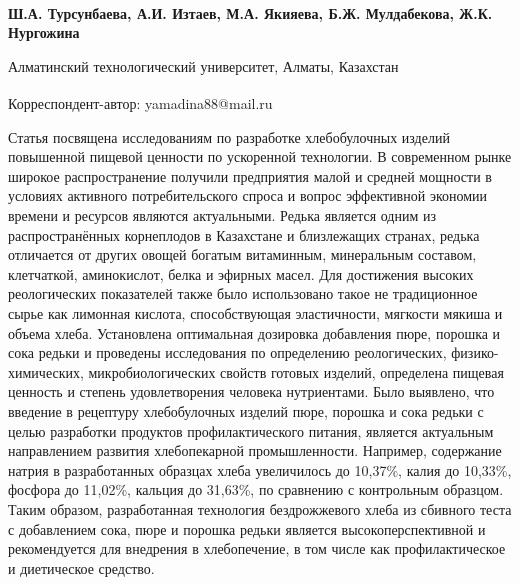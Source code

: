 
\begin{articleheader}

{\bfseries
Ш.А. Турсунбаева,
А.И. Изтаев,
М.А. Якияева\textsuperscript{\envelope },
Б.Ж. Мулдабекова,
Ж.К. Нургожина
}
\end{articleheader}

\begin{affiliation}
Алматинский технологический университет, Алматы, Казахстан

\raggedright \textsuperscript{\envelope }Корреспондент-автор: yamadina88@mail.ru
\end{affiliation}

Статья посвящена исследованиям по разработке хлебобулочных изделий
повышенной пищевой ценности по ускоренной технологии. В современном
рынке широкое распространение получили предприятия малой и средней
мощности в условиях активного потребительского спроса и вопрос
эффективной экономии времени и ресурсов являются актуальными. Редька
является одним из распространённых корнеплодов в Казахстане и
близлежащих странах, редька отличается от других овощей богатым
витаминным, минеральным составом, клетчаткой, аминокислот, белка и
эфирных масел. Для достижения высоких реологических показателей также
было использовано такое не традиционное сырье как лимонная кислота,
способствующая эластичности, мягкости мякиша и объема хлеба. Установлена
оптимальная дозировка добавления пюре, порошка и сока редьки и проведены
исследования по определению реологических, физико-химических,
микробиологических свойств готовых изделий, определена пищевая ценность
и степень удовлетворения человека нутриентами. Было выявлено, что
введение в рецептуру хлебобулочных изделий пюре, порошка и сока редьки с
целью разработки продуктов профилактического питания, является
актуальным направлением развития хлебопекарной промышленности. Например,
содержание натрия в разработанных образцах хлеба увеличилось до 10,37\%,
калия до 10,33\%, фосфора до 11,02\%, кальция до 31,63\%, по сравнению с
контрольным образцом. Таким образом, разработанная технология
бездрожжевого хлеба из сбивного теста с добавлением сока, пюре и порошка
редьки является высокоперспективной и рекомендуется для внедрения в
хлебопечение, в том числе как профилактическое и диетическое средство.

